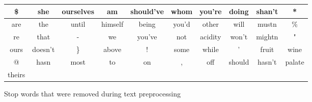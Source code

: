 \documentclass[12pt]{IEEEtran}
\begin{document}
\begin{figure}
{\begin{tabular}{|c|c|c|c|c|c|c|c|c|c|}
        \hline
        \$ & she & ourselves & am & should've &    whom & you're & doing & shan't & * \\
        \hline
        are & the & until & himself & being &    you'd & other & will & mustn & \% \\
        \hline
        re & that & - & we & you've &    not & acidity & won't & mightn & " \\
        \hline
        ours & doesn't & \} & above & ! &    some & while & ' & fruit & wine \\
        \hline
        @ & hasn & most & to & on &    , & off & should & hasn't & palate \\
        \hline
        theirs & & & & & & & & & \\
        \hline
    \end{tabular}}
    \caption{Stop words that were removed during text preprocessing}
    \label{stop_words}
    \end{figure}
\end{document}
